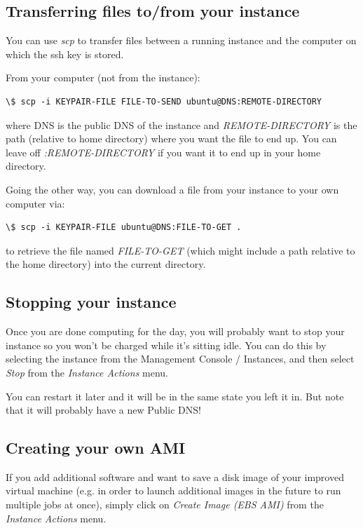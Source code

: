 \documentclass[letterpaper,10pt,english]{sphinxmanual}
\begin{document}
\subsection{Transferring files to/from your instance}
\label{aws:transferring-files-to-from-your-instance}
You can use \emph{scp} to transfer files between a running instance and
the computer on which the ssh key is stored.

From your computer (not from the instance):

\begin{Verbatim}[commandchars=\\\{\}]
\$ scp -i KEYPAIR-FILE FILE-TO-SEND ubuntu@DNS:REMOTE-DIRECTORY
\end{Verbatim}

where DNS is the public DNS of the instance and \emph{REMOTE-DIRECTORY} is
the path (relative to home directory)
where you want the file to end up.  You can leave off
\emph{:REMOTE-DIRECTORY} if you want it to end up in your home directory.

Going the other way, you can download a file from your instance to
your own computer via:

\begin{Verbatim}[commandchars=\\\{\}]
\$ scp -i KEYPAIR-FILE ubuntu@DNS:FILE-TO-GET .
\end{Verbatim}

to retrieve the file named \emph{FILE-TO-GET} (which might include a path
relative to the home directory) into the current directory.


\subsection{Stopping your instance}
\label{aws:stopping-your-instance}
Once you are done computing for the day, you will probably want to stop your
instance so you won't be charged while it's sitting idle.  You can do this
by selecting the instance from the Management Console / Instances, and then
select \emph{Stop} from the \emph{Instance Actions} menu.

You can restart it later and it will be in the same state you left it in.
But note that it will probably have a new Public DNS!


\subsection{Creating your own AMI}
\label{aws:creating-your-own-ami}
If you add additional software and want to save a disk image of your
improved virtual machine (e.g. in order to launch additional images in the
future to run multiple jobs at once), simply click on \emph{Create Image (EBS
AMI)} from the \emph{Instance Actions} menu.
\end{document}
